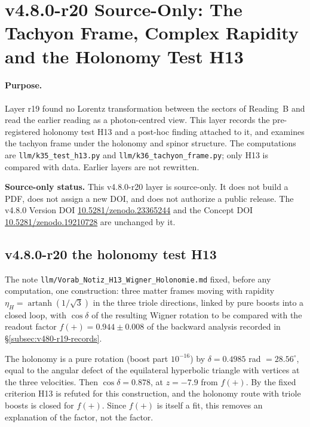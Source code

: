\clearpage
\section*{v4.8.0-r20 Source-Only: The Tachyon Frame, Complex Rapidity and the Holonomy Test H13}
\label{sec:v480-r20-tachyon-complex-rapidity}

\paragraph{Purpose.}
Layer r19 found no Lorentz transformation between the sectors of Reading~B and read the earlier reading as a
photon-centred view.  This layer records the pre-registered holonomy test H13 and a post-hoc finding attached to it,
and examines the tachyon frame under the holonomy and spinor structure.  The computations are
\texttt{llm/k35\_test\_h13.py} and \texttt{llm/k36\_tachyon\_frame.py}; only H13 is compared with data.  Earlier layers
are not rewritten.

\noindent\textbf{Source-only status.}
This v4.8.0-r20 layer is source-only.  It does not build a PDF, does not assign a new DOI,
and does not authorize a public release.  The v4.8.0 Version DOI
\href{https://doi.org/10.5281/zenodo.23365244}{10.5281/zenodo.23365244} and the Concept DOI
\href{https://doi.org/10.5281/zenodo.19210728}{10.5281/zenodo.19210728} are unchanged by it.

\subsection*{v4.8.0-r20 the holonomy test H13}
\label{subsec:v480-r20-h13}

The note \texttt{llm/Vorab\_Notiz\_H13\_Wigner\_Holonomie.md} fixed, before any computation, one construction: three
matter frames moving with rapidity \(\eta_H=\operatorname{artanh}(1/\sqrt3)\) in the three triole directions, linked by
pure boosts into a closed loop, with \(\cos\delta\) of the resulting Wigner rotation to be compared with the readout
factor \(f(+)=0.944\pm0.008\) of the backward analysis recorded in \S\ref{subsec:v480-r19-records}.

The holonomy is a pure rotation (boost part \(10^{-16}\)) by \(\delta=0.4985\) rad \(=28.56^\circ\), equal to the
angular defect of the equilateral hyperbolic triangle with vertices at the three velocities.  Then
\(\cos\delta=0.878\), at \(z=-7.9\) from \(f(+)\).  By the fixed criterion H13 is refuted for this construction, and the
holonomy route with triole boosts is closed for \(f(+)\).  Since \(f(+)\) is itself a fit, this removes an explanation
of the factor, not the factor.


